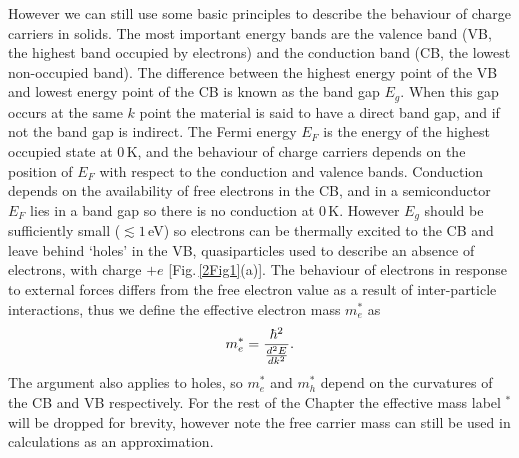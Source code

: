 However we can still use some basic principles to describe the behaviour of charge carriers in solids. The most important energy bands are the valence band (VB, the highest band occupied by electrons) and the conduction band (CB, the lowest non-occupied band). The difference between the highest energy point of the VB and lowest energy point of the CB is known as the band gap $E_g$. When this gap occurs at the same $k$ point the material is said to have a direct band gap, and if not the band gap is indirect. The Fermi energy $E_F$ is the energy of the highest occupied state at 0\,K, and the behaviour of charge carriers depends on the position of $E_F$ with respect to the conduction and valence bands. Conduction depends on the availability of free electrons in the CB, and in a semiconductor $E_F$ lies in a band gap so there is no conduction at 0\,K. However $E_g$ should be sufficiently small ($\lesssim1$\,eV) so electrons can be thermally excited to the CB and leave behind `holes' in the VB, quasiparticles used to describe an absence of electrons, with charge $+e$ [Fig.\,\ref{2Fig1}(a)]. The behaviour of electrons in response to external forces differs from the free electron value as a result of inter-particle interactions, thus we define the effective electron mass $m_e^*$ as
\begin{equation}
\centering
m_e^{*} = \frac{\hbar^2}{\frac{d^2E}{dk^2}} .
\label{effectivemass}
\end{equation}
The argument also applies to holes, so $m_e^*$ and $m_h^*$ depend on the curvatures of the CB and VB respectively. For the rest of the Chapter the effective mass label $^*$ will be dropped for brevity, however note the free carrier mass can still be used in calculations as an approximation.

